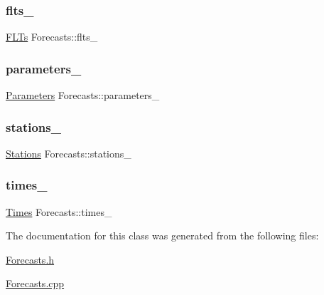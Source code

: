 \subsubsection{\texorpdfstring{flts\+\_\+}{flts\_}}
{\footnotesize\ttfamily \mbox{\hyperlink{class_f_l_ts}{F\+L\+Ts}} Forecasts\+::flts\+\_\+\hspace{0.3cm}{\ttfamily [protected]}}

\mbox{\label{class_forecasts_a3705673d34a2f6468659955fb3d28abb}} 
\subsubsection{\texorpdfstring{parameters\+\_\+}{parameters\_}}
{\footnotesize\ttfamily \mbox{\hyperlink{class_parameters}{Parameters}} Forecasts\+::parameters\+\_\+\hspace{0.3cm}{\ttfamily [protected]}}

\mbox{\label{class_forecasts_a5557d3b6c0700d6da88d2610f95287ab}} 
\subsubsection{\texorpdfstring{stations\+\_\+}{stations\_}}
{\footnotesize\ttfamily \mbox{\hyperlink{class_stations}{Stations}} Forecasts\+::stations\+\_\+\hspace{0.3cm}{\ttfamily [protected]}}

\mbox{\label{class_forecasts_abe5747fb6460d05937ab95ff3b7f8b3f}} 
\subsubsection{\texorpdfstring{times\+\_\+}{times\_}}
{\footnotesize\ttfamily \mbox{\hyperlink{class_times}{Times}} Forecasts\+::times\+\_\+\hspace{0.3cm}{\ttfamily [protected]}}



The documentation for this class was generated from the following files\+:\begin{DoxyCompactItemize}
\item 
\mbox{\hyperlink{_forecasts_8h}{Forecasts.\+h}}\item 
\mbox{\hyperlink{_forecasts_8cpp}{Forecasts.\+cpp}}\end{DoxyCompactItemize}
